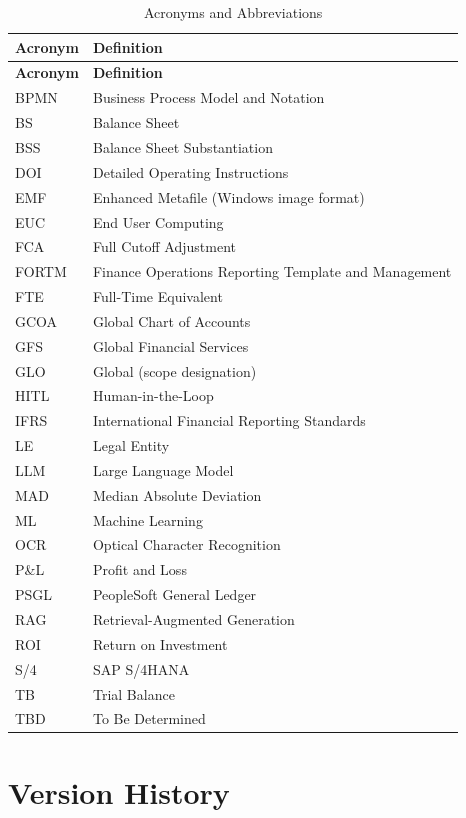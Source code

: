 \begin{longtable}{@{}L{3cm}L{10.5cm}@{}}
\caption{Acronyms and Abbreviations}
\label{tab:acronyms} \\
\toprule
\textbf{Acronym} & \textbf{Definition} \\
\midrule
\endfirsthead
\toprule
\textbf{Acronym} & \textbf{Definition} \\
\midrule
\endhead
BPMN & Business Process Model and Notation \\
BS & Balance Sheet \\
BSS & Balance Sheet Substantiation \\
DOI & Detailed Operating Instructions \\
EMF & Enhanced Metafile (Windows image format) \\
EUC & End User Computing \\
FCA & Full Cutoff Adjustment \\
FORTM & Finance Operations Reporting Template and Management \\
FTE & Full-Time Equivalent \\
GCOA & Global Chart of Accounts \\
GFS & Global Financial Services \\
GLO & Global (scope designation) \\
HITL & Human-in-the-Loop \\
IFRS & International Financial Reporting Standards \\
LE & Legal Entity \\
LLM & Large Language Model \\
MAD & Median Absolute Deviation \\
ML & Machine Learning \\
OCR & Optical Character Recognition \\
P\&L & Profit and Loss \\
PSGL & PeopleSoft General Ledger \\
RAG & Retrieval-Augmented Generation \\
ROI & Return on Investment \\
S/4 & SAP S/4HANA \\
TB & Trial Balance \\
TBD & To Be Determined \\
\bottomrule
\end{longtable}

\section{Version History}
\label{sec:version-history}

